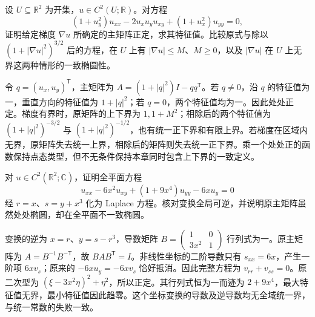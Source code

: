 \begin{exercise}\label{b2:ex:08-quasilinear-ellipticity}
设 \(U\subseteq\mathbb R^2\) 为开集，\(u\in C^2(U;\mathbb R)\)。对方程
\[
 (1+u_y^2)u_{xx}-2u_xu_yu_{xy}+(1+u_x^2)u_{yy}=0,
\]
证明给定梯度 \(\nabla u\) 所确定的主矩阵正定，求其特征值。比较原式与除以 \((1+|\nabla u|^2)^{3/2}\) 后的方程，在 \(U\) 上有 \(|\nabla u|\leq M\)、\(M\geq0\)，以及 \(|\nabla u|\) 在 \(U\) 上无界这两种情形的一致椭圆性。
\end{exercise}
\begin{solution}
令 \(q=(u_x,u_y)^{\mathsf T}\)，主矩阵为 \(A=(1+|q|^2)I-qq^{\mathsf T}\)。若 \(q\ne0\)，沿 \(q\) 的特征值为一，垂直方向的特征值为 \(1+|q|^2\)；若 \(q=0\)，两个特征值均为一。因此处处正定。梯度有界时，原矩阵的上下界为 \(1,1+M^2\)；相除后的两个特征值为 \((1+|q|^2)^{-3/2}\) 与 \((1+|q|^2)^{-1/2}\)，也有统一正下界和有限上界。若梯度在区域内无界，原矩阵失去统一上界，相除后的矩阵则失去统一正下界。乘一个处处正的函数保持点态类型，但不无条件保持本章同时包含上下界的一致定义。
\end{solution}

\begin{exercise}\label{b2:ex:08-nonlinear-shear}
对 \(u\in C^2(\mathbb R^2;\mathbb C)\)，证明全平面方程
\[
 u_{xx}-6x^2u_{xy}+(1+9x^4)u_{yy}-6x u_y=0
\]
经 \(r=x\)、\(s=y+x^3\) 化为 Laplace 方程。核对变换全局可逆，并说明原主矩阵虽然处处椭圆，却在全平面不一致椭圆。
\end{exercise}
\begin{solution}
变换的逆为 \(x=r\)、\(y=s-r^3\)，导数矩阵 \(B=\left(\begin{smallmatrix}1&0\\3x^2&1\end{smallmatrix}\right)\) 行列式为一。原主矩阵为 \(A=B^{-1}B^{-\mathsf T}\)，故 \(BAB^{\mathsf T}=I\)。非线性坐标的二阶导数只有 \(s_{xx}=6x\)，产生一阶项 \(6xv_s\)；原来的 \(-6xu_y=-6xv_s\) 恰好抵消。因此完整方程为 \(v_{rr}+v_{ss}=0\)。原二次型为 \((\xi-3x^2\eta)^2+\eta^2\)，所以正定。其行列式恒为一而迹为 \(2+9x^4\)，最大特征值无界，最小特征值因此趋零。这个坐标变换的导数及逆导数均无全域统一界，与统一常数的失败一致。
\end{solution}

